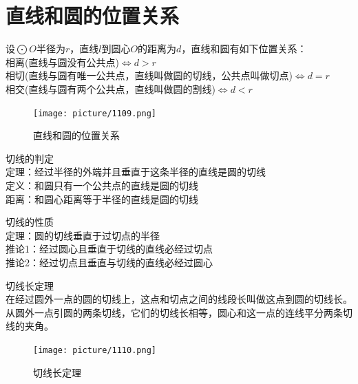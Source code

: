 \documentclass{ecnuthesis}
\begin{document}
\section{直线和圆的位置关系}
\begin{knowledge}
    设$\bigodot O$半径为$r$，直线$l$到圆心$O$的距离为$d$，直线和圆有如下位置关系：\\
    相离(直线与圆没有公共点)$\Leftrightarrow d > r$ \\
    相切(直线与圆有唯一公共点，直线叫做圆的切线，公共点叫做切点)$\Leftrightarrow d = r$ \\
    相交(直线与圆有两个公共点，直线叫做圆的割线)$\Leftrightarrow d < r$
\end{knowledge}
\begin{figure}[H]
\centering
\texttt{[image: picture/1109.png]}
\caption{直线和圆的位置关系}
\end{figure}
\begin{knowledge}
    切线的判定 \\
    定理：经过半径的外端并且垂直于这条半径的直线是圆的切线 \\
    定义：和圆只有一个公共点的直线是圆的切线 \\
    距离：和圆心距离等于半径的直线是圆的切线
\end{knowledge}
\begin{knowledge}
    切线的性质 \\
    定理：圆的切线垂直于过切点的半径 \\
    推论1：经过圆心且垂直于切线的直线必经过切点 \\
    推论2：经过切点且垂直与切线的直线必经过圆心
\end{knowledge}
\begin{knowledge}
    切线长定理 \\
    在经过圆外一点的圆的切线上，这点和切点之间的线段长叫做这点到圆的切线长。\\
    从圆外一点引圆的两条切线，它们的切线长相等，圆心和这一点的连线平分两条切线的夹角。
\end{knowledge}
\begin{figure}[H]
\centering
\texttt{[image: picture/1110.png]}
\caption{切线长定理}
\end{figure}
\clearpage
\end{document}
